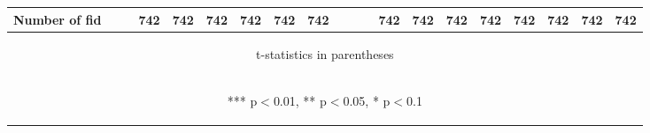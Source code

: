 \documentclass[]{article}
\begin{document}
\begin{center}
\begin{tabular}{lccccccccccccccccccc}
        Number of fid         &                                                &                                                & 742                                            & 742                                            & 742                                            & 742                                            & 742                                            & 742                                            &                                                &                                                &                                                & 742                                            & 742                                            & 742                                            & 742                                            & 742                                            & 742                                            & 742                                            & 742                                            \\ \hline
        \multicolumn{20}{c}{\begin{footnotesize} t-statistics in parentheses\end{footnotesize}}                                                                                                                                                                                                                                                                                                                                                                                                                                                                                                                                                                                                                                                                                                                                                                                                                                                                                                  \\
        \multicolumn{20}{c}{\begin{footnotesize} *** p$<$0.01, ** p$<$0.05, * p$<$0.1\end{footnotesize}}                                                                                                                                                                                                                                                                                                                                                                                                                                                                                                                                                                                                                                                                                                                                                                                                                                                                                         \\
    \end{tabular}
\end{center}
\end{document}
